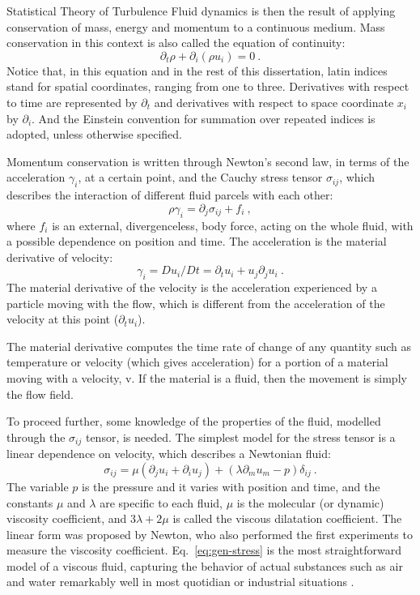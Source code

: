\begin{chapter}{Statistical Theory of Turbulence}
Fluid dynamics is then the result of applying conservation of mass,
energy and momentum to a continuous medium.
Mass conservation in this context is also called the equation of continuity:
\begin{equation} \label{eq:mass}
    \partial_t \rho + \partial_i (\rho u_i) = 0 \ .
\end{equation}
Notice that, in this equation and in the rest of this dissertation, latin
indices stand for spatial coordinates, ranging from one to three.
Derivatives with respect to time are represented by $\partial_t$
and derivatives with respect to space coordinate $x_i$ by $\partial_i$.
And the Einstein convention for
summation over repeated indices is adopted, unless otherwise specified.

Momentum conservation is written through Newton's second law,
in terms of the acceleration $\gamma_i$, at a certain point,
and the Cauchy stress tensor $\sigma_{ij}$, which describes
the interaction of different fluid parcels with each other:
\begin{equation}
    \rho \gamma_i = \partial_j \sigma_{ij} + f_i \ ,
\end{equation}
where $f_i$ is an external, divergenceless, body force, acting on the whole
fluid, with a possible dependence on position and time.
The acceleration is the material derivative of velocity:
\begin{equation}
    \gamma_i = D u_i / Dt = \partial_t u_i + u_j \partial_j u_i \ .
\end{equation}
The material derivative of the velocity is the acceleration experienced by a particle moving with the flow, which is different from the acceleration of the velocity at this point ($\partial_t u_i$).

The material derivative computes the time rate of change of any quantity such as temperature or velocity (which gives acceleration) for a portion of a material moving with a velocity, v. If the material is a fluid, then the movement is simply the flow field.


To proceed further, some knowledge of the properties of the fluid,
modelled through the $\sigma_{ij}$ tensor,
is needed. The simplest model for the stress tensor
is a linear dependence on velocity, which describes a Newtonian fluid:
\begin{equation} \label{eq:gen-stress}
    \sigma_{ij} = \mu (\partial_j u_i + \partial_i u_j )
    + (\lambda \partial_m u_m - p) \delta_{ij} \ .
\end{equation}
The variable $p$ is the pressure and it varies with position and time,
and the constants
$\mu$ and $\lambda$ are specific to each fluid, $\mu$ is
the molecular (or dynamic) viscosity
coefficient, and $3\lambda+2\mu$ is called the viscous dilatation coefficient.
The linear form was proposed by Newton, who also
performed the first experiments to measure the viscosity coefficient.
Eq.~\ref{eq:gen-stress} is the most straightforward model of a viscous fluid,
capturing the behavior of actual substances
such as air and water remarkably well in most quotidian or
industrial situations \parencite{kremer2010}.


\end{chapter}
